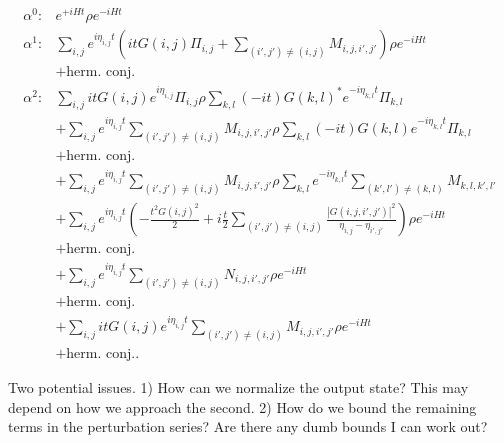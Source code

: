 \documentclass{article}
\newcommand{\parens}[1]{\left( #1 \right)}
\newcommand{\abs}[1]{\left| #1 \right|}
\begin{document}
\begin{align}
\alpha^0 :& e^{+i H t} \rho e^{-i H t} \\
 \alpha^1 :& \sum_{i,j} e^{i\eta_{i,j}t} \parens{i t G(i,j) \Pi_{i,j} + \sum_{(i',j') \neq (i,j)} M_{i,j,i',j'}} \rho e^{- i H t} \\
 &+ \text{herm. conj.} \\
 \alpha^2 :& \sum_{i,j} i t G(i,j) e^{i \eta_{i,j}} \Pi_{i,j} \rho \sum_{k,l} (-i t) G(k,l)^* e^{-i \eta_{k,l}t} \Pi_{k,l} \\
 &+ \sum_{i,j} e^{i \eta_{i,j} t} \sum_{(i',j') \neq (i,j)} M_{i,j,i',j'} \rho \sum_{k,l} (-i t) G(k,l) e^{-i \eta_{k,l} t} \Pi_{k,l} \\
 &+ \text{herm. conj.} \\
 &+ \sum_{i,j} e^{i \eta_{i,j} t} \sum_{(i',j') \neq (i,j)} M_{i,j,i',j'} \rho \sum_{k,l} e^{-i \eta_{k,l} t} \sum_{(k',l') \neq (k,l)} M_{k,l,k',l'}\\
 &+  \sum_{i,j} e^{i \eta_{i,j} t} \parens{- \frac{t^2 G(i,j)^2}{2} + i \frac{t}{2} \sum_{(i',j') \neq (i,j)} \frac{\abs{G(i,j,i',j')}^2}{\eta_{i,j} - \eta_{i',j'}} } \rho e^{- i H t} \\
 &+ \text{herm. conj.} \\
 &+ \sum_{i,j} e^{i \eta_{i,j} t} \sum_{(i',j') \neq (i,j)} N_{i,j,i',j'} \rho e^{-i H t} \\
 &+ \text{herm. conj.} \\
 &+ \sum_{i,j} i t G(i,j) e^{i \eta_{i,j} t} \sum_{(i',j') \neq (i,j)} M_{i,j,i',j'} \rho e^{-i H t} \\
 &+ \text{herm. conj.}.
\end{align}

Two potential issues. 1) How can we normalize the output state? This may depend on how we approach the second. 2) How do we bound the remaining terms in the perturbation series? Are there any dumb bounds I can work out? 
\end{document}
